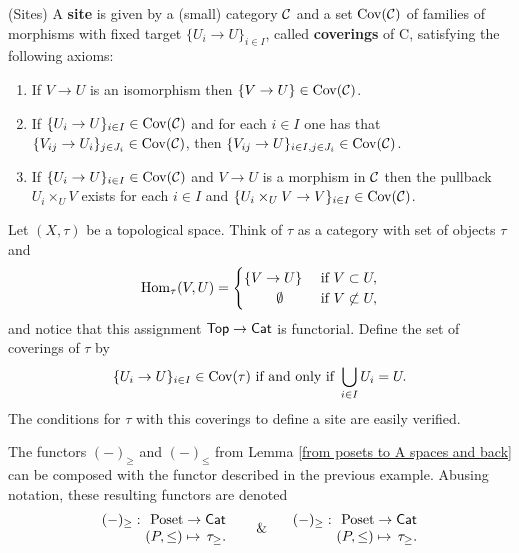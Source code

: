 \documentclass[thesis.tex]{subfiles}
\begin{document}
\begin{definition}(Sites)
A \textbf{site} is given by a (small) category $\operatorname{\mathcal{C}}$ and a set $\operatorname{Cov}(\operatorname{\mathcal{C}})$ of families of
morphisms with fixed target $\{U_i\to U\}_{i\in I}$, called \textbf{coverings} of C, satisfying the
following axioms:
\begin{enumerate}[S1:]
\item If $V\to U$ is an isomorphism then $\{V\to U\}\in\operatorname{Cov}(\operatorname{\mathcal{C}})$.
\item If $\{U_i\to U\}_{i\in I}\in\operatorname{Cov}(\operatorname{\mathcal{C}})$ and for each $i\in I$ one has that $\{V_{ij}\to U_i\}_{j\in J_i}\in\operatorname{Cov}(\operatorname{\mathcal{C}})$,
    then $\{V_{ij}\to U\}_{i\in I, j\in J_i}\in\operatorname{Cov}(\operatorname{\mathcal{C}})$.
\item If $\{U_i\to U\}_{i\in I}\in\operatorname{Cov}(\operatorname{\mathcal{C}})$ and $V\to U$ is a morphism in $\operatorname{\mathcal{C}}$ then the pullback $U_i\times_U V$ exists for each $i\in I$ and $\{U_i\times_U V\to V\}_{i\in I}\in\operatorname{Cov}(\operatorname{\mathcal{C}})$.
\end{enumerate}
\end{definition}

\begin{example}\label{open sets as a site}
Let $(X,\tau)$ be a topological space. Think of $\tau$ as a category with set of objects $\tau$ and $$\mathrm{Hom}_\tau(V,U)=\begin{cases}\{V\to U\}& \text{ if } V\subset U,\\ \hspace*{.81cm} \emptyset & \text{ if } V\not\subset U,\end{cases}$$
and notice that this assignment $\mathsf{Top}\to\mathsf{Cat}$ is functorial. Define the set of coverings of $\tau$ by
$$\{U_i\to U\}_{i\in I}\in\Cov(\tau) \text{ if and only if } \bigcup_{i\in I}U_i=U.\vspace*{-3pt}$$
The conditions for $\tau$ with this coverings to define a site are easily verified.
\end{example}

\begin{remark}\label{rmk: Poset -> Top -> site}
The functors $(-)_\geq$ and $(-)_\leq$ from Lemma \ref{from posets to A spaces and back} can be composed with the functor described in the previous example. Abusing notation, these resulting functors are denoted
$$\begin{array}{cc}
(-)_\geq:\!\! & \Poset\to\Cat \\
 & \!\!(P,\leq)\mapsto\,\tau_\geq.
\end{array} \text{\ \ \ \ \  \& \ \ \ } \begin{array}{cc}
(-)_\geq:\!\! & \Poset\to\Cat \\
 & \!\!(P,\leq)\mapsto\,\tau_\geq.
\end{array}$$
\end{remark}
\end{document}
